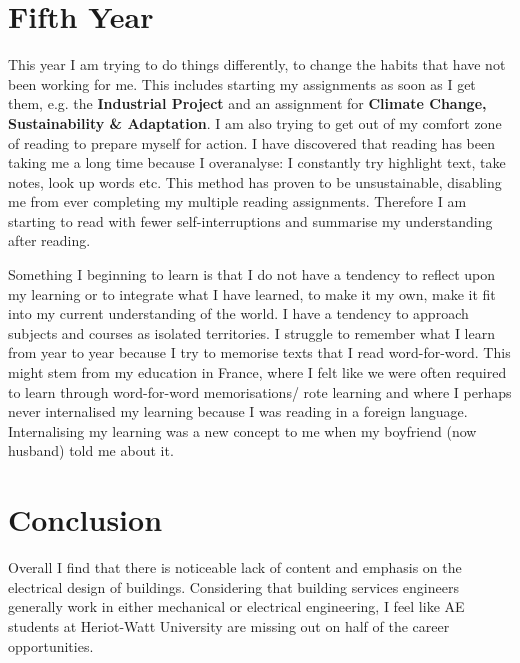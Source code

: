\section{Fifth Year}

This year I am trying to do things differently, to change the habits that have not been working for me.
This includes starting my assignments as soon as I get them, e.g. the \textbf{Industrial Project} and an assignment for \textbf{Climate Change, Sustainability \& Adaptation}.
I am also trying to get out of my comfort zone of reading to prepare myself for action.
I have discovered that reading has been taking me a long time because I overanalyse: I constantly try highlight text, take notes, look up words etc.
This method has proven to be unsustainable, disabling me from ever completing my multiple reading assignments.
Therefore I am starting to read with fewer self-interruptions and summarise my understanding after reading.

Something I beginning to learn is that I do not have a tendency to reflect upon my learning or to integrate what I have learned, to make it my own, make it fit into my current understanding of the world.
I have a tendency to approach subjects and courses as isolated territories.
I struggle to remember what I learn from year to year because I try to memorise texts that I read word-for-word.
This might stem from my education in France, where I felt like we were often required to learn through word-for-word memorisations/ rote learning and where I perhaps never internalised my learning because I was reading in a foreign language.
Internalising my learning was a new concept to me when my boyfriend (now husband) told me about it.



\section{Conclusion}

Overall I find that there is noticeable lack of content and emphasis on the electrical design of buildings.
Considering that building services engineers generally work in either mechanical or electrical engineering, I feel like AE students at Heriot-Watt University are missing out on half of the career opportunities.